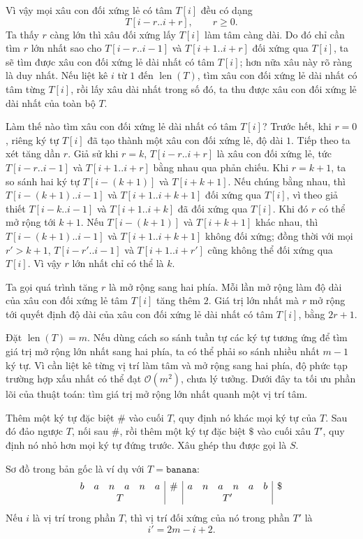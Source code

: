 \documentclass[11pt]{article}
\newcommand{\Oh}{\mathcal{O}}
\newcommand{\Len}{\operatorname{len}}
\begin{document}
Vì vậy mọi xâu con đối xứng lẻ có tâm \(T[i]\) đều có dạng
\[
  T[i-r..i+r],\qquad r\ge 0.
\]
Ta thấy \(r\) càng lớn thì xâu đối xứng lấy \(T[i]\) làm tâm càng dài. Do đó
chỉ cần tìm \(r\) lớn nhất sao cho \(T[i-r..i-1]\) và \(T[i+1..i+r]\) đối
xứng qua \(T[i]\), ta sẽ tìm được xâu con đối xứng lẻ dài nhất có tâm
\(T[i]\); hơn nữa xâu này rõ ràng là duy nhất. Nếu liệt kê \(i\) từ \(1\) đến
\(\Len(T)\), tìm xâu con đối xứng lẻ dài nhất có tâm từng \(T[i]\), rồi lấy
xâu dài nhất trong số đó, ta thu được xâu con đối xứng lẻ dài nhất của toàn
bộ \(T\).

Làm thế nào tìm xâu con đối xứng lẻ dài nhất có tâm \(T[i]\)? Trước hết, khi
\(r=0\), riêng ký tự \(T[i]\) đã tạo thành một xâu con đối xứng lẻ, độ dài
\(1\). Tiếp theo ta xét tăng dần \(r\). Giả sử khi \(r=k\),
\(T[i-r..i+r]\) là xâu con đối xứng lẻ, tức \(T[i-r..i-1]\) và
\(T[i+1..i+r]\) bằng nhau qua phản chiếu. Khi \(r=k+1\), ta so sánh hai ký
tự \(T[i-(k+1)]\) và \(T[i+k+1]\). Nếu chúng bằng nhau, thì
\(T[i-(k+1)..i-1]\) và \(T[i+1..i+k+1]\) đối xứng qua \(T[i]\), vì theo giả
thiết \(T[i-k..i-1]\) và \(T[i+1..i+k]\) đã đối xứng qua \(T[i]\). Khi đó
\(r\) có thể mở rộng tới \(k+1\). Nếu \(T[i-(k+1)]\) và \(T[i+k+1]\) khác
nhau, thì \(T[i-(k+1)..i-1]\) và \(T[i+1..i+k+1]\) không đối xứng; đồng thời
với mọi \(r'>k+1\), \(T[i-r'..i-1]\) và \(T[i+1..i+r']\) cũng không thể đối
xứng qua \(T[i]\). Vì vậy \(r\) lớn nhất chỉ có thể là \(k\).

Ta gọi quá trình tăng \(r\) là mở rộng sang hai phía. Mỗi lần mở rộng làm độ
dài của xâu con đối xứng lẻ tâm \(T[i]\) tăng thêm \(2\). Giá trị lớn nhất mà
\(r\) mở rộng tới quyết định độ dài của xâu con đối xứng lẻ dài nhất có tâm
\(T[i]\), bằng \(2r+1\).

Đặt \(\Len(T)=m\). Nếu dùng cách so sánh tuần tự các ký tự tương ứng để tìm
giá trị mở rộng lớn nhất sang hai phía, ta có thể phải so sánh nhiều nhất
\(m-1\) ký tự. Vì cần liệt kê từng vị trí làm tâm và mở rộng sang hai phía,
độ phức tạp trường hợp xấu nhất có thể đạt \(\Oh(m^2)\), chưa lý tưởng. Dưới
đây ta tối ưu phần lõi của thuật toán: tìm giá trị mở rộng lớn nhất quanh một
vị trí tâm.

Thêm một ký tự đặc biệt \(\texttt{\#}\) vào cuối \(T\), quy định nó khác mọi
ký tự của \(T\). Sau đó đảo ngược \(T\), nối sau \(\texttt{\#}\), rồi thêm
một ký tự đặc biệt \(\texttt{\$}\) vào cuối xâu \(T'\), quy định nó nhỏ hơn
mọi ký tự đứng trước. Xâu ghép thu được gọi là \(S\).

Sơ đồ trong bản gốc là ví dụ với \(T=\texttt{banana}\):
\[
\begin{array}{cccccc|c|cccccc|c}
b&a&n&a&n&a&\#&a&n&a&n&a&b&\$\\
\multicolumn{6}{c|}{T} && \multicolumn{6}{c|}{T'}
\end{array}
\]
Nếu \(i\) là vị trí trong phần \(T\), thì vị trí đối xứng của nó trong phần
\(T'\) là
\[
  i'=2m-i+2.
\]
\end{document}
